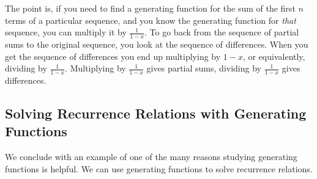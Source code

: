 \documentclass[10pt,]{book}
\theoremstyle{plain}
\theoremstyle{definition}
\theoremstyle{definition}
\theoremstyle{definition}
\theoremstyle{definition}
\numberwithin{equation}{chapter}
\begin{document}
\par
\hypertarget{p-998}{}%
The point is, if you need to find a generating function for the sum of the first \(n\) terms of a particular sequence, and you know the generating function for \emph{that} sequence, you can multiply it by  \(\frac{1}{1-x}\). To go back from the sequence of partial sums to the original sequence, you look at the sequence of differences. When you get the sequence of differences you end up multiplying by \(1-x\), or equivalently, dividing by \(\frac{1}{1-x}\). Multiplying by \(\frac{1}{1-x}\) gives partial sums, dividing by \(\frac{1}{1-x}\) gives differences.%
\typeout{************************************************}
\typeout{************************************************}
\subsection[{Solving Recurrence Relations with Generating Functions}]{Solving Recurrence Relations with Generating Functions}\label{subsection-24}
\hypertarget{p-999}{}%
We conclude with an example of one of the many reasons studying generating functions is helpful. We can use generating functions to solve recurrence relations.%
\end{document}

